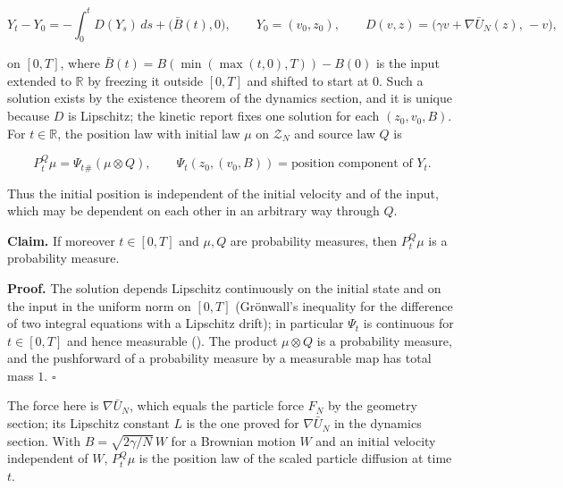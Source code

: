 \documentclass[11pt,a4paper]{report}
\begin{document}
\[Y_t-Y_0=-\int_0^tD(Y_s)\,ds+\bigl(\bar B(t),0\bigr),\qquad Y_0=(v_0,z_0),\qquad D(v,z)=\bigl(\gamma v+\nabla\bar U_N(z),\,-v\bigr),\]


on \([0,T]\), where \(\bar B(t)=B(\min(\max(t,0),T))-B(0)\) is the input extended to \(\mathbb R\) by freezing it outside \([0,T]\) and shifted to start at \(0\). Such a solution exists by the existence theorem of the dynamics section, and it is unique because \(D\) is Lipschitz; the kinetic report fixes one solution for each \((z_0,v_0,B)\). For \(t\in\mathbb R\), the position law with initial law \(\mu\) on \(\mathcal Z_N\) and source law \(Q\) is


\[P^Q_t\mu=\Psi_t{}_\#(\mu\otimes Q),\qquad\Psi_t(z_0,(v_0,B))=\text{position component of }Y_t.\]


Thus the initial position is independent of the initial velocity and of the input, which may be dependent on each other in an arbitrary way through \(Q\).




\textbf{Claim.} If moreover \(t\in[0,T]\) and \(\mu,Q\) are probability measures, then \(P^Q_t\mu\) is a probability measure.




\textbf{Proof.} The solution depends Lipschitz continuously on the initial state and on the input in the uniform norm on \([0,T]\) (Grönwall's inequality for the difference of two integral equations with a Lipschitz drift); in particular \(\Psi_t\) is continuous for \(t\in[0,T]\) and hence measurable (\cite[Section~3.9.4]{LangevinLean2026Kinetic}). The product \(\mu\otimes Q\) is a probability measure, and the pushforward of a probability measure by a measurable map has total mass \(1\). \(\square\)




The force here is \(\nabla\bar U_N\), which equals the particle force \(F_N\) by the geometry section; its Lipschitz constant \(L\) is the one proved for \(\nabla\bar U_N\) in the dynamics section. With \(B=\sqrt{2\gamma/N}\,W\) for a Brownian motion \(W\) and an initial velocity independent of \(W\), \(P^Q_t\mu\) is the position law of the scaled particle diffusion at time \(t\).
\end{document}
